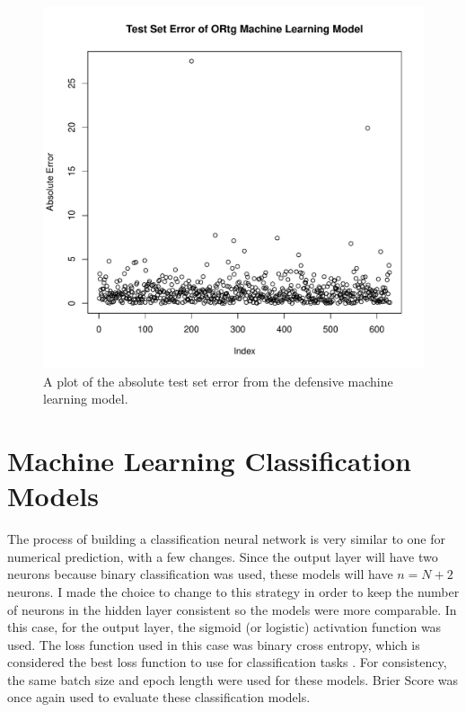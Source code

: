 \documentclass[12pt]{article}
\begin{document}
\begin{figure}[tbp]
	\centering
	\includegraphics[width=\textwidth]{dmlnp.test.error}
	\caption{A plot of the absolute test set error from the defensive machine learning model.}
	\label{fig:dmlnp.test.error}
\end{figure}

\begin{table}[tbp]
\caption{Defensive Neural Network Model Evaluators}
\centering
{}
\label{tab:dmlnp-results}
\end{table}

\section{Machine Learning Classification Models}
\label{sec:mlc}
The process of building a classification neural network is very similar to one for numerical prediction, with a few changes. Since the output layer will have two neurons because binary classification was used, these models will have \(n=N+2\) neurons. I made the choice to change to this strategy in order to keep the number of neurons in the hidden layer consistent so the models were more comparable. In this case, for the output layer, the sigmoid (or logistic) activation function was used. The loss function used in this case was binary cross entropy, which is considered the best loss function to use for classification tasks \citep[][]{ruby2020binary}. For consistency, the same batch size and epoch length were used for these models. Brier Score was once again used to evaluate these classification models.
\end{document}
